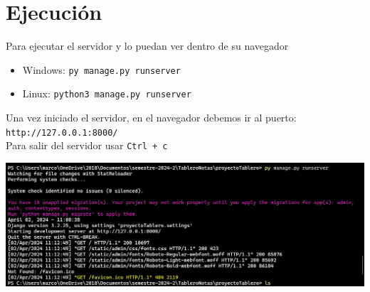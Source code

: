 \newpage
\section{Ejecución}

Para ejecutar el servidor y lo puedan ver dentro de su navegador

\begin{itemize}
    \item Windows:  \texttt{py manage.py runserver}    
    \item Linux: \texttt{python3 manage.py runserver}
\end{itemize}

Una vez iniciado el servidor, en el navegador debemos ir al puerto: \texttt{http://127.0.0.1:8000/}\\

Para salir del servidor usar \texttt{Ctrl + c}

\begin{center}
    \includegraphics[scale = .47]{IMA/ejecucion.png}
\end{center}